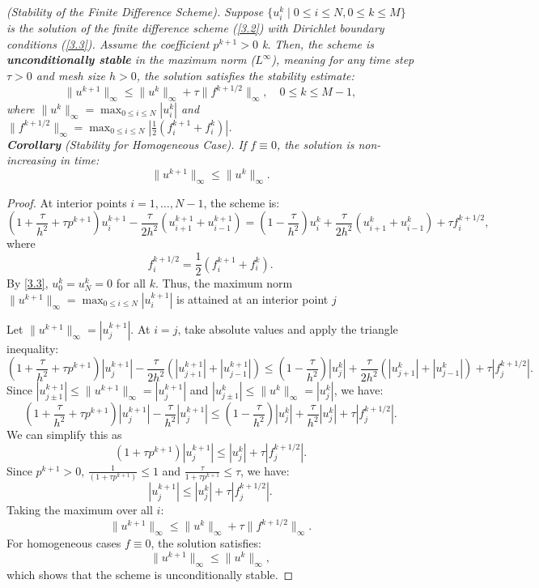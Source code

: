 \documentclass[reqno]{amsart}
\begin{document}
\begin{theorem}\label{theorem2} 
\textit{(Stability of the Finite Difference Scheme).}  
\textit{Suppose $\{u_i^k \mid 0 \leq i \leq N, 0 \leq k \leq M\}$ is the solution of the finite difference scheme (\ref{3.2}) with Dirichlet boundary conditions (\ref{3.3}). Assume the coefficient $p^{k+1} > 0 $  k.}
\textit{Then, the scheme is \textbf{unconditionally stable} in the maximum norm ($L^\infty$), meaning for any time step $\tau > 0$ and mesh size $h > 0$, the solution satisfies the stability estimate:}
\[
\|u^{k+1}\|_\infty \leq \|u^k\|_\infty + \tau \|f^{k+1/2}\|_\infty, \quad 0 \leq k \leq M-1,
\]
\textit{where $\|u^k\|_\infty = \max_{0 \leq i \leq N} |u_i^k|$ and $\|f^{k+1/2}\|_\infty = \max_{0 \leq i \leq N} \left|\frac{1}{2}(f_i^{k+1} + f_i^k)\right|$.}\\
\textit{\textbf{Corollary} (Stability for Homogeneous Case). If $f \equiv 0$, the solution is non-increasing in time:}
\[
\|u^{k+1}\|_\infty \leq \|u^k\|_\infty.
\]
\end{theorem}

\begin{proof}\label{proof2} At interior points \(i=1,…,N-1\), the scheme is:  
\[
(1 + \frac{\tau}{h^2} + \tau p^{k+1})u_i^{k+1} - \frac{\tau}{2h^2}(u_{i+1}^{k+1} + u_{i-1}^{k+1}) = (1 - \frac{\tau}{h^2})u_i^k + \frac{\tau}{2h^2}(u_{i+1}^k + u_{i-1}^k) + \tau f_i^{k+1/2},
\] 
where \[ f_i^{k+1/2} = \frac{1}{2}(f_i^{k+1} + f_i^k).\]
By \eqref{3.3}, \(u_0^k = u_N^k = 0\) for all $k$. Thus, the maximum norm $\|u^{k+1}\|_\infty = \max_{0 \leq i \leq N} |u_i^{k+1}|$
 is attained at an interior point $j$

Let \(\|u^{k+1}\|_\infty = |u_j^{k+1}|\). At $i = j$, take absolute values and apply the triangle inequality:
\[
(1 + \frac{\tau}{h^2} + \tau p^{k+1})|u_j^{k+1}| - \frac{\tau}{2h^2}(|u_{j+1}^{k+1}| + |u_{j-1}^{k+1}|) \leq (1 - \frac{\tau}{h^2})|u_j^k| + \frac{\tau}{2h^2}(|u_{j+1}^k| + |u_{j-1}^k|) + \tau|f_j^{k+1/2}|.
\]
Since \(|u_{j\pm1}^{k+1}| \leq \|u^{k+1}\|_\infty = |u_j^{k+1}|\) and \(|u_{j\pm1}^k| \leq \|u^k\|_\infty = |u_j^k|\), we have:
\[
(1 + \frac{\tau}{h^2} + \tau p^{k+1})|u_j^{k+1}| - \frac{\tau}{h^2}|u_j^{k+1}| \leq (1 - \frac{\tau}{h^2})|u_j^k| + \frac{\tau}{h^2}|u_j^k| + \tau|f_j^{k+1/2}|.
\]
We can simplify this as
\[
(1 + \tau p^{k+1})|u_j^{k+1}| \leq |u_j^k| + \tau |f_j^{k+1/2}|.
\]
Since $p^{k+1} > 0$,  $\frac{1}{(1 + \tau p^{k+1})}\leq 1$ and $\frac{\tau}{1 + \tau p^{k+1}} \leq \tau$, we have:
\[
|u_j^{k+1}| \leq |u_j^k| +\tau|f_j^{k+1/2}|.
\]
Taking the maximum over all \(i\):
\[
\|u^{k+1}\|_\infty \leq \|u^k\|_\infty + \tau \|f^{k+1/2}\|_\infty.
\]
For homogeneous cases  $f \equiv 0$, the solution satisfies:
\[
\|u^{k+1}\|_\infty \leq \|u^k\|_\infty,
\]
which shows that the scheme is unconditionally stable. 
\end{proof}
\end{document}
